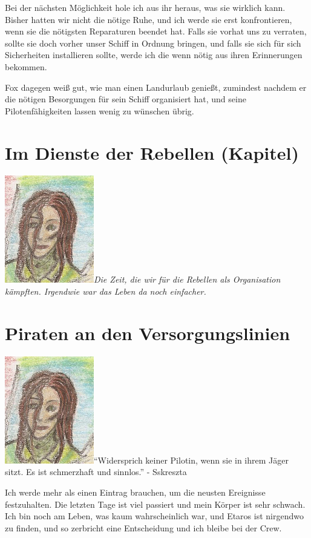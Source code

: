 \documentclass[11pt]{scrartcl}
\begin{document}
Bei der nächsten Möglichkeit hole ich aus ihr heraus, was sie wirklich
kann. Bisher hatten wir nicht die nötige Ruhe, und ich werde sie erst
konfrontieren, wenn sie die nötigsten Reparaturen beendet hat. Falls sie
vorhat uns zu verraten, sollte sie doch vorher unser Schiff in Ordnung
bringen, und falls sie sich für sich Sicherheiten installieren sollte,
werde ich die wenn nötig aus ihren Erinnerungen bekommen.

Fox dagegen weiß gut, wie man einen Landurlaub genießt, zumindest
nachdem er die nötigen Besorgungen für sein Schiff organisiert hat, und
seine Pilotenfähigkeiten lassen wenig zu wünschen übrig.

\section{Im Dienste der Rebellen (Kapitel)}

\includegraphics{sskreszta-portrait-alt-klein.png}\emph{Die Zeit,
die wir für die Rebellen als Organisation kämpften. Irgendwie war das
Leben da noch einfacher.}

\section{Piraten an den Versorgungslinien}

\includegraphics{sskreszta-portrait-alt-klein.png}``Widersprich
keiner Pilotin, wenn sie in ihrem Jäger sitzt. Es ist schmerzhaft und
sinnlos.'' - Sskreszta

Ich werde mehr als einen Eintrag brauchen, um die neusten Ereignisse
festzuhalten. Die letzten Tage ist viel passiert und mein Körper ist
sehr schwach. Ich bin noch am Leben, was kaum wahrscheinlich war, und
Etaros ist nirgendwo zu finden, und so zerbricht eine Entscheidung und
ich bleibe bei der Crew.
\end{document}
